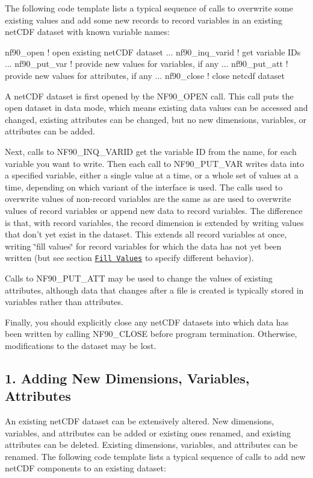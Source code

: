 The following code template lists a typical sequence of calls to overwrite some existing values and add some new records to record variables in an existing net\+C\+DF dataset with known variable names\+:


\begin{DoxyCode}
nf90\_open             \textcolor{comment}{! open existing netCDF dataset}
  ...
  nf90\_inq\_varid      \textcolor{comment}{! get variable IDs}
  ...
  nf90\_put\_var        \textcolor{comment}{! provide new values for variables, if any}
  ...
  nf90\_put\_att        \textcolor{comment}{! provide new values for attributes, if any}
    ...
nf90\_close            ! \textcolor{keyword}{close} netcdf dataset
\end{DoxyCode}


A net\+C\+DF dataset is first opened by the N\+F90\+\_\+\+O\+P\+EN call. This call puts the open dataset in data mode, which means existing data values can be accessed and changed, existing attributes can be changed, but no new dimensions, variables, or attributes can be added.

Next, calls to N\+F90\+\_\+\+I\+N\+Q\+\_\+\+V\+A\+R\+ID get the variable ID from the name, for each variable you want to write. Then each call to N\+F90\+\_\+\+P\+U\+T\+\_\+\+V\+AR writes data into a specified variable, either a single value at a time, or a whole set of values at a time, depending on which variant of the interface is used. The calls used to overwrite values of non-\/record variables are the same as are used to overwrite values of record variables or append new data to record variables. The difference is that, with record variables, the record dimension is extended by writing values that don’t yet exist in the dataset. This extends all record variables at once, writing \char`\"{}fill values\char`\"{} for record variables for which the data has not yet been written (but see section \href{#Fill-Values}{\tt Fill Values} to specify different behavior).

Calls to N\+F90\+\_\+\+P\+U\+T\+\_\+\+A\+TT may be used to change the values of existing attributes, although data that changes after a file is created is typically stored in variables rather than attributes.

Finally, you should explicitly close any net\+C\+DF datasets into which data has been written by calling N\+F90\+\_\+\+C\+L\+O\+SE before program termination. Otherwise, modifications to the dataset may be lost.\hypertarget{f90-use-of-the-netcdf-library_f90-adding-new-dimensions-variables-attributes}{}\subsection{1. Adding New Dimensions, Variables, Attributes }\label{f90-use-of-the-netcdf-library_f90-adding-new-dimensions-variables-attributes}
An existing net\+C\+DF dataset can be extensively altered. New dimensions, variables, and attributes can be added or existing ones renamed, and existing attributes can be deleted. Existing dimensions, variables, and attributes can be renamed. The following code template lists a typical sequence of calls to add new net\+C\+DF components to an existing dataset\+:


